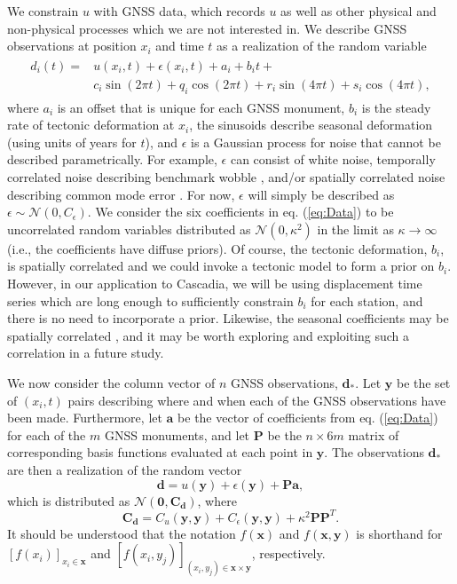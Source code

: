 \documentclass[10pt,a4paper]{article}
\begin{document}
We constrain $u$ with GNSS data, which records $u$ as well as other physical and non-physical processes which we are not interested in. We describe GNSS observations at position $x_i$ and time $t$ as a realization of the random variable 
\begin{align}\label{eq:Data}
\begin{split}
d_{i}(t) = &u(x_i,t) + \epsilon(x_i,t) + a_{i} + b_{i}t + \\
         &c_{i}\sin(2 \pi t) + q_{i}\cos(2 \pi t) + r_{i}\sin(4 \pi t) + s_{i}\cos(4 \pi t), 
\end{split}
\end{align}
where $a_{i}$ is an offset that is unique for each GNSS monument, $b_{i}$ is the steady rate of tectonic deformation at $x_i$, the sinusoids describe seasonal deformation (using units of years for $t$), and $\epsilon$ is a Gaussian process for noise that cannot be described parametrically. For example, $\epsilon$ can consist of white noise, temporally correlated noise describing benchmark wobble \citep[e.g.,][]{Wyatt1982,Wyatt1989}, and/or spatially correlated noise describing common mode error \citep[e.g.,][]{Wdowinski1997}. For now, $\epsilon$ will simply be described as $\epsilon \sim \mathcal{N}(0,C_\epsilon)$. We consider the six coefficients in eq. (\ref{eq:Data}) to be uncorrelated random variables distributed as $\mathcal{N}(0,\kappa^2)$ in the limit as $\kappa \to \infty$ (i.e., the coefficients have diffuse priors). Of course, the tectonic deformation, $b_{i}$, is spatially correlated and we could invoke a tectonic model to form a prior on $b_{i}$. However, in our application to Cascadia, we will be using displacement time series which are long enough to sufficiently constrain $b_{i}$ for each station, and there is no need to incorporate a prior. Likewise, the seasonal coefficients may be spatially correlated \citep{Langbein2008}, and it may be worth exploring and exploiting such a correlation in a future study. 

We now consider the column vector of $n$ GNSS observations, $\bm{d}_*$. Let $\bm{y}$ be the set of $(x_i, t)$ pairs describing where and when each of the GNSS observations have been made. Furthermore, let $\bm{a}$ be the vector of coefficients from eq. (\ref{eq:Data}) for each of the $m$ GNSS monuments, and let $\bm{P}$ be the $n \times 6m$ matrix of corresponding basis functions evaluated at each point in $\bm{y}$. The observations $\bm{d}_*$ are then a realization of the random vector
\begin{equation}
\bm{d} = u(\bm{y}) + \epsilon(\bm{y}) + \bm{P}\bm{a},
\end{equation}
which is distributed as $\mathcal{N}(\bm{0},\bm{C_d})$, where
\begin{equation}\label{eq:Cd}
\bm{C_d} = C_u(\bm{y},\bm{y}) + C_\epsilon(\bm{y},\bm{y}) + 
           \kappa^2\bm{P}\bm{P}^T.
\end{equation}
It should be understood that the notation $f(\bm{x})$ and $f(\bm{x},\bm{y})$ is shorthand for $[f(x_i)]_{x_i \in \bm{x}}$ and $[f(x_i,y_j)]_{(x_i,y_j) \in \bm{x} \times \bm{y}}$, respectively. 
\end{document}

